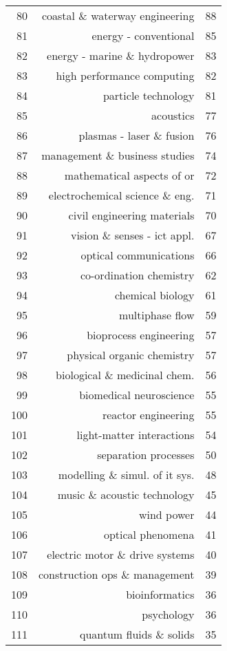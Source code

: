 \begin{spacing}{0.9}
\begin{longtable}[c]{r|r|>{\raggedleft\arraybackslash}m{2.3cm}}
{80} & {coastal \& waterway engineering} & {88}\\
{81} & {energy - conventional} & {85}\\
{82} & {energy - marine \& hydropower} & {83}\\
{83} & {high performance computing} & {82}\\
{84} & {particle technology} & {81}\\
{85} & {acoustics} & {77}\\
{86} & {plasmas - laser \& fusion} & {76}\\
{87} & {management \& business studies} & {74}\\
{88} & {mathematical aspects of or} & {72}\\
{89} & {electrochemical science \& eng.} & {71}\\
{90} & {civil engineering materials} & {70}\\
{91} & {vision \& senses - ict appl.} & {67}\\
{92} & {optical communications} & {66}\\
{93} & {co-ordination chemistry} & {62}\\
{94} & {chemical biology} & {61}\\
{95} & {multiphase flow} & {59}\\
{96} & {bioprocess engineering} & {57}\\
{97} & {physical organic chemistry} & {57}\\
{98} & {biological \& medicinal chem.} & {56}\\
{99} & {biomedical neuroscience} & {55}\\
{100} & {reactor engineering} & {55}\\
{101} & {light-matter interactions} & {54}\\
{102} & {separation processes} & {50}\\
{103} & {modelling \& simul. of it sys.} & {48}\\
{104} & {music \& acoustic technology} & {45}\\
{105} & {wind power} & {44}\\
{106} & {optical phenomena} & {41}\\
{107} & {electric motor \& drive systems} & {40}\\
{108} & {construction ops \& management} & {39}\\
{109} & {bioinformatics} & {36}\\
{110} & {psychology} & {36}\\
{111} & {quantum fluids \& solids} & {35}\\

\end{longtable}
\end{spacing}
